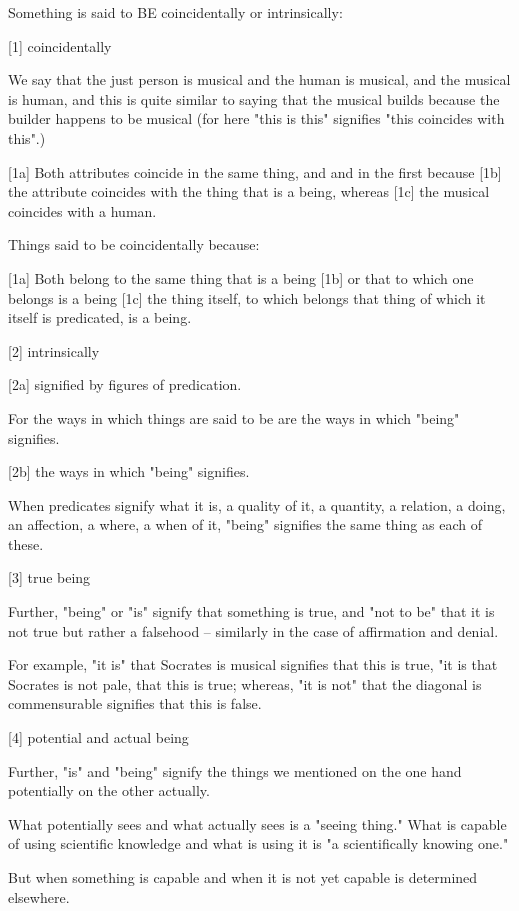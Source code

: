 
Something is said to BE coincidentally or intrinsically:

[1]     coincidentally

        We say that the just person is musical and the human is musical,
        and the musical is human, and this is quite similar to saying that
        the musical builds because the builder happens to be musical
        (for here "this is this" signifies "this coincides with this".)

[1a]    Both attributes coincide in the same thing, and and in the first because
[1b]    the attribute coincides with the thing that is a being, whereas
[1c]    the musical coincides with a human.

        Things said to be coincidentally because:

[1a]    Both belong to the same thing that is a being
[1b]    or that to which one belongs is a being
[1c]    the thing itself, to which belongs that thing of which it itself is predicated, is a being.

[2]     intrinsically

[2a]    signified by figures of predication.

        For the ways in which things are said to be are the ways in which
        "being" signifies.

[2b]    the ways in which "being" signifies.
        
        When predicates signify what it is, a quality of it,
        a quantity, a relation, a doing, an affection, a where, a when of it,
        "being" signifies the same thing as each of these.

[3]     true being

        Further, "being" or "is" signify that something is true, and "not to be" that it is not true
        but rather a falsehood -- similarly in the case of affirmation and denial.

        For example, "it is" that Socrates is musical signifies that this is true,
        "it is that Socrates is not pale, that this is true; whereas,
        "it is not" that the diagonal is commensurable signifies that this is false.

[4]      potential and actual being

        Further, "is" and "being" signify the things we mentioned
        on the one hand potentially on the other actually.

What potentially sees and what actually sees is a "seeing thing."
What is capable of using scientific knowledge and
what is using it is "a scientifically knowing one."

But when something is capable and when it is not yet capable is determined elsewhere.
